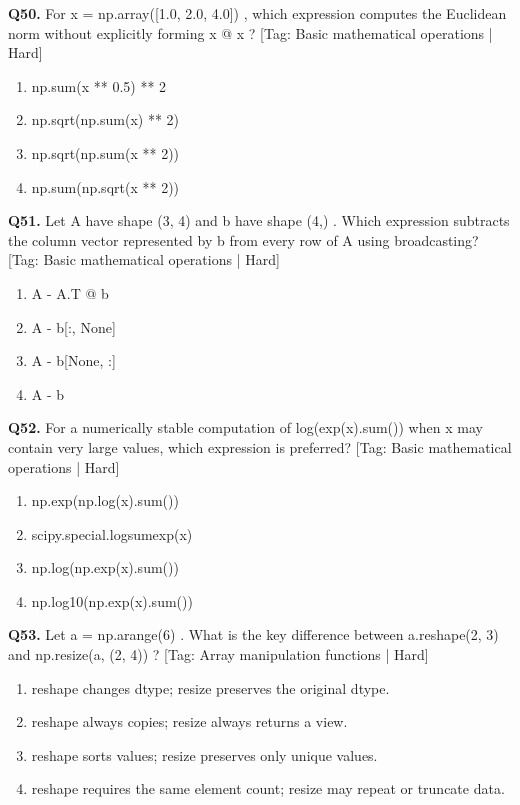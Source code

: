 \vspace{2mm}
\noindent\textbf{Q50.} For x = np.array([1.0, 2.0, 4.0]) , which expression computes the Euclidean norm without explicitly forming x @ x ? \hfill [Tag: Basic mathematical operations | Hard]
\begin{enumerate}[label=(\alph*),topsep=2pt,itemsep=1pt,partopsep=0pt,parsep=0pt]
    \item {np.sum(x ** 0.5) ** 2}
    \item {np.sqrt(np.sum(x) ** 2)}
    \item {np.sqrt(np.sum(x ** 2))}
    \item {np.sum(np.sqrt(x ** 2))}
\end{enumerate}
\vspace{2mm}
\noindent\textbf{Q51.} Let A have shape (3, 4) and b have shape (4,) . Which expression subtracts the column vector represented by b from every row of A using broadcasting? \hfill [Tag: Basic mathematical operations | Hard]
\begin{enumerate}[label=(\alph*),topsep=2pt,itemsep=1pt,partopsep=0pt,parsep=0pt]
    \item {A - A.T @ b}
    \item {A - b[:, None]}
    \item {A - b[None, :]}
    \item {A - b}
\end{enumerate}
\vspace{2mm}
\noindent\textbf{Q52.} For a numerically stable computation of log(exp(x).sum()) when x may contain very large values, which expression is preferred? \hfill [Tag: Basic mathematical operations | Hard]
\begin{enumerate}[label=(\alph*),topsep=2pt,itemsep=1pt,partopsep=0pt,parsep=0pt]
    \item {np.exp(np.log(x).sum())}
    \item {scipy.special.logsumexp(x)}
    \item {np.log(np.exp(x).sum())}
    \item {np.log10(np.exp(x).sum())}
\end{enumerate}
\vspace{2mm}
\noindent\textbf{Q53.} Let a = np.arange(6) . What is the key difference between a.reshape(2, 3) and np.resize(a, (2, 4)) ? \hfill [Tag: Array manipulation functions | Hard]
\begin{enumerate}[label=(\alph*),topsep=2pt,itemsep=1pt,partopsep=0pt,parsep=0pt]
    \item {reshape changes dtype; resize preserves the original dtype.}
    \item {reshape always copies; resize always returns a view.}
    \item {reshape sorts values; resize preserves only unique values.}
    \item {reshape requires the same element count; resize may repeat or truncate data.}
\end{enumerate}
